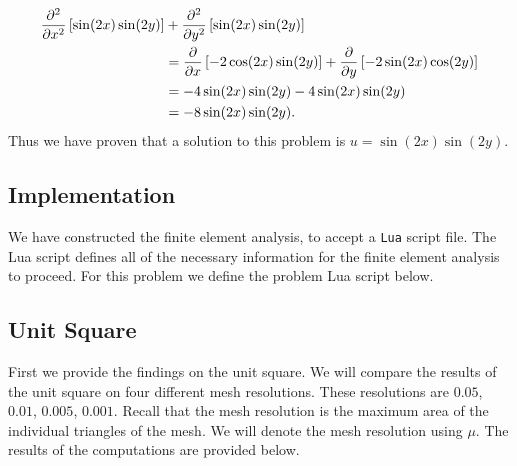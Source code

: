 \documentclass[../fem.tex]{subfile}
\begin{document}
\begin{align*}
  \frac{\partial^2 }{\partial {x}^2}\left[\sin(2x)\sin(2y)\right]&+\frac{\partial^2 }{\partial {y}^2}\left[\sin(2x)\sin(2y)\right]\\
                                          &=\frac{\partial }{\partial x}\left[-2\cos(2x)\sin(2y)\right]+\frac{\partial }{\partial y}\left[-2\sin(2x)\cos(2y)\right]\\
                                          &=-4\sin(2x)\sin(2y)-4\sin(2x)\sin(2y)\\
                                          &=-8\sin(2x)\sin(2y).
\end{align*}
Thus we have proven that a solution to this problem is $u=\sin(2x)\sin(2y)$.

\subsection{Implementation}%
\label{sub:implementation}

We have constructed the finite element analysis, to accept a \texttt{Lua}
script file. The Lua script defines all of the necessary information for the
finite element analysis to proceed. For this problem we define the problem Lua
script below.


\subsection{Unit Square}%
\label{sub:unit_square}

First we provide the findings on the unit square. We will compare the results
of the unit square on four different mesh resolutions. These resolutions are
$0.05$, $0.01$, $0.005$, $0.001$. Recall that the mesh resolution is the maximum
area of the individual triangles of the mesh. We will denote the mesh
resolution using $\mu$. The results of the computations are provided below.
\end{document}
